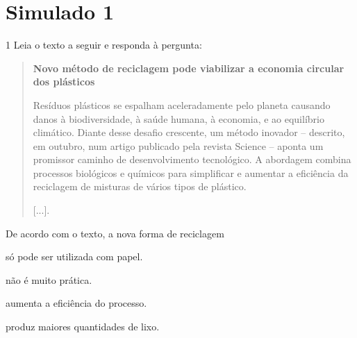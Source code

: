 
\chapter{Simulado 1}

\num{1} Leia o texto a seguir e responda à pergunta:

\begin{quote}
\textbf{Novo método de reciclagem pode viabilizar a economia circular dos plásticos}

Resíduos plásticos se espalham aceleradamente pelo planeta causando
danos à biodiversidade, à saúde humana, à economia, e ao equilíbrio
climático. Diante desse desafio crescente, um método inovador --
descrito, em outubro, num artigo publicado pela revista Science --
aponta um promissor caminho de desenvolvimento tecnológico. A abordagem
combina processos biológicos e químicos para simplificar e aumentar a
eficiência da reciclagem de misturas de vários tipos de plástico.

{[}...{]}.

\end{quote}

De acordo com o texto, a nova forma de reciclagem

\begin{escolha}
\item só pode ser utilizada com papel.

\item não é muito prática.

\item aumenta a eficiência do processo.

\item produz maiores quantidades de lixo.
\end{escolha}

